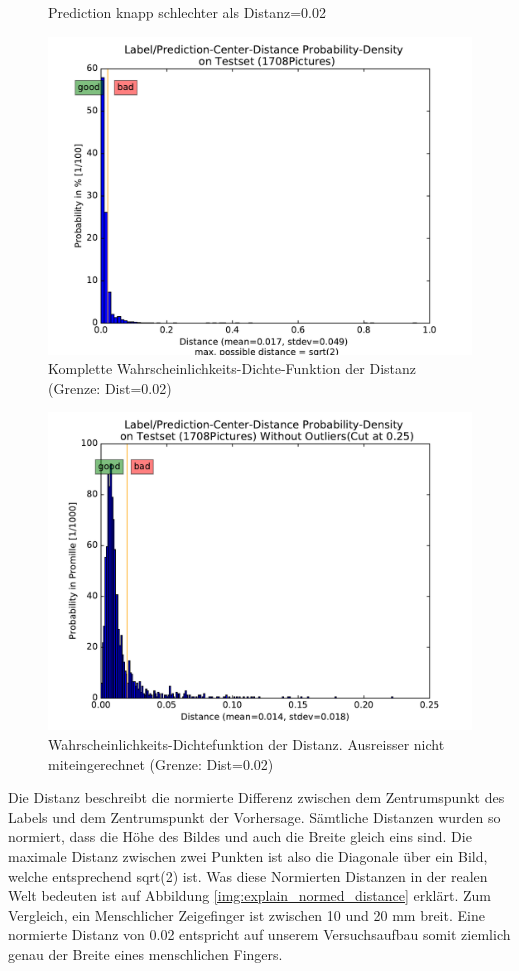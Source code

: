 \begin{figure}
\begin{minipage}[b]{0.48\textwidth}
	\end{minipage}
	\caption{Prediction knapp schlechter als Distanz=0.02}	
	\label{img:distanz_knapp_schlecht}
\end{figure}

\begin{figure}	
	\centering
	\includegraphics[width=.7\textwidth]{Kapitel/70Resultate/Bilder/distProbDensity.pdf}
	\caption{Komplette Wahrscheinlichkeits-Dichte-Funktion der Distanz (Grenze: Dist=0.02)}
	\label{img:dist_dichte}
\end{figure}
\begin{figure}	
	\centering
	\includegraphics[width=.7\textwidth]{Kapitel/70Resultate/Bilder/distProbDensity_improved.pdf}
	\caption{Wahrscheinlichkeits-Dichtefunktion der Distanz. Ausreisser nicht miteingerechnet (Grenze: Dist=0.02)}
	\label{img:dist_dichte_improved}
\end{figure}

Die Distanz beschreibt die normierte Differenz zwischen dem Zentrumspunkt des Labels und dem Zentrumspunkt der Vorhersage. 
Sämtliche Distanzen wurden so normiert, dass die Höhe des Bildes und auch die Breite gleich eins sind. 
Die maximale Distanz zwischen zwei Punkten ist also die Diagonale über ein Bild, welche entsprechend sqrt(2) ist.
Was diese Normierten Distanzen in der realen Welt bedeuten ist auf Abbildung \ref{img:explain_normed_distance} erklärt. 
Zum Vergleich, ein Menschlicher Zeigefinger ist zwischen 10 und 20 mm breit.
Eine normierte Distanz von 0.02 entspricht auf unserem Versuchsaufbau somit ziemlich genau der Breite eines menschlichen Fingers. 

